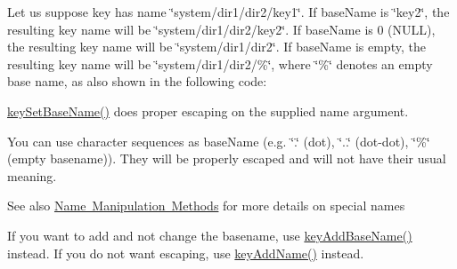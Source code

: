 Let us suppose {\ttfamily key} has name {\ttfamily \char`\"{}system/dir1/dir2/key1\char`\"{}}. If {\ttfamily base\+Name} is {\ttfamily \char`\"{}key2\char`\"{}}, the resulting key name will be {\ttfamily \char`\"{}system/dir1/dir2/key2\char`\"{}}. If {\ttfamily base\+Name} is 0 (N\+U\+LL), the resulting key name will be {\ttfamily \char`\"{}system/dir1/dir2\char`\"{}}. If {\ttfamily base\+Name} is empty, the resulting key name will be {\ttfamily \char`\"{}system/dir1/dir2/\%\char`\"{}}, where {\ttfamily \char`\"{}\%\char`\"{}} denotes an empty base name, as also shown in the following code\+:


\begin{DoxyCodeInclude}{0}
\end{DoxyCodeInclude}
 \mbox{\hyperlink{group__keyname_ga6e804bd453f98c28b0ff51430d1df407}{key\+Set\+Base\+Name()}} does proper escaping on the supplied name argument.

You can use character sequences as {\ttfamily base\+Name} (e.\+g. {\ttfamily \char`\"{}.\char`\"{}} (dot), {\ttfamily \char`\"{}..\char`\"{}} (dot-\/dot), {\ttfamily \char`\"{}\%\char`\"{}} (empty basename)). They will be properly escaped and will not have their usual meaning.

\begin{DoxySeeAlso}{See also}
\mbox{\hyperlink{group__keyname}{Name Manipulation Methods}} for more details on special names
\end{DoxySeeAlso}
If you want to add and not change the basename, use \mbox{\hyperlink{group__keyname_gaa942091fc4bd5c2699e49ddc50829524}{key\+Add\+Base\+Name()}} instead. If you do not want escaping, use \mbox{\hyperlink{group__keyname_gaa70593a2c772c4b7bc33423b9b10a270}{key\+Add\+Name()}} instead.

